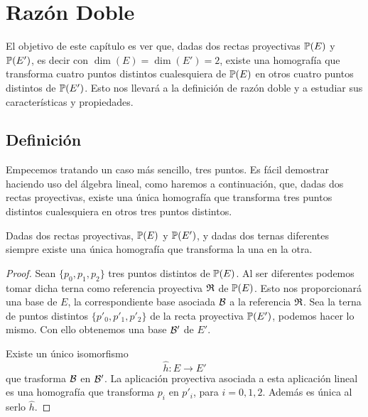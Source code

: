 \chapter{Razón Doble}
El objetivo de este capítulo es ver que, dadas dos rectas proyectivas $\mathbb{P}(E)$ y $\mathbb{P}(E')$, es decir con $\dim(E)=\dim(E')=2$,  existe una homografía que transforma cuatro puntos distintos cualesquiera de $\mathbb{P}(E)$ en otros cuatro puntos distintos de $\mathbb{P}(E')$. Esto nos llevará a la definición de razón doble y a estudiar sus características y propiedades.

\section{Definición}
Empecemos tratando un caso más sencillo, tres puntos. Es fácil demostrar haciendo uso del álgebra lineal, como haremos a continuación, que, dadas dos rectas proyectivas, existe una única homografía que transforma tres puntos distintos cualesquiera en otros tres puntos distintos.

\begin{prop}
	\label{C5_prop_homografia3puntos}
	Dadas dos rectas proyectivas, $\mathbb{P}(E)$ y $\mathbb{P}(E')$, y dadas dos ternas diferentes siempre existe una única homografía que transforma la una en la otra.
\end{prop}
\begin{proof}
	Sean $\{p_0,p_1,p_2\}$ tres puntos distintos de $\mathbb{P}(E)$. Al ser diferentes podemos tomar dicha terna como referencia proyectiva $\mathfrak{R}$ de $\mathbb{P}(E)$. Esto nos proporcionará una base de $E$, la correspondiente base asociada $\mathcal{B}$ a la referencia $\mathfrak{R}$. Sea la terna de puntos distintos $\{p'_0,p'_1,p'_2\}$ de la recta proyectiva $\mathbb{P}(E')$, podemos hacer lo mismo. Con ello obtenemos una base $\mathcal{B'}$ de $E'$. 
	
	Existe un único isomorfismo 
	\[\widehat{h}:E\rightarrow E'\]
	que trasforma $\mathcal{B}$ en $\mathcal{B'}$. La aplicación proyectiva asociada a esta aplicación lineal es una homografía que transforma $p_i$ en $p'_i$, para $i=0,1,2$. Además es única al serlo $\widehat{h}$.
\end{proof}

